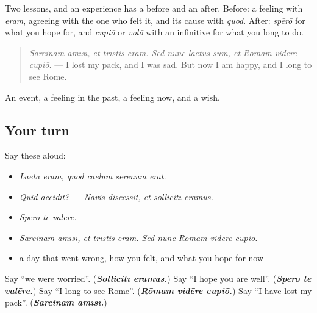\begin{grammarlens}[title={What you've built}]
Two lessons, and an experience has a before and an after. Before: a feeling with \emph{eram}, agreeing with the one who felt it, and its cause with \emph{quod}. After: \emph{spērō} for what you hope for, and \emph{cupiō} or \emph{volō} with an infinitive for what you long to do.

\begin{quote}
\emph{Sarcinam āmīsī, et trīstis eram. Sed nunc laetus sum, et Rōmam vidēre cupiō.} — I lost my pack, and I was sad. But now I am happy, and I long to see Rome.
\end{quote}

An event, a feeling in the past, a feeling now, and a wish.
\end{grammarlens}

\subsection*{Your turn}
Say these aloud:

\begin{itemize}
\raggedright
  \item \emph{Laeta eram, quod caelum serēnum erat.}
  \item \emph{Quid accidit? — Nāvis discessit, et sollicitī erāmus.}
  \item \emph{Spērō tē valēre.}
  \item \emph{Sarcinam āmīsī, et trīstis eram. Sed nunc Rōmam vidēre cupiō.}
  \item a day that went wrong, how you felt, and what you hope for now
\end{itemize}

\begin{tcolorbox}[breakable,colback=teal!4,colframe=teal!35!black,title={Before you move on}]
Say \textquotedblleft{}we were worried\textquotedblright{}. (\emph{\textbf{Sollicitī erāmus.}}) Say \textquotedblleft{}I hope you are well\textquotedblright{}. (\emph{\textbf{Spērō tē valēre.}}) Say \textquotedblleft{}I long to see Rome\textquotedblright{}. (\emph{\textbf{Rōmam vidēre cupiō.}}) Say \textquotedblleft{}I have lost my pack\textquotedblright{}. (\emph{\textbf{Sarcinam āmīsī.}})
\end{tcolorbox}
